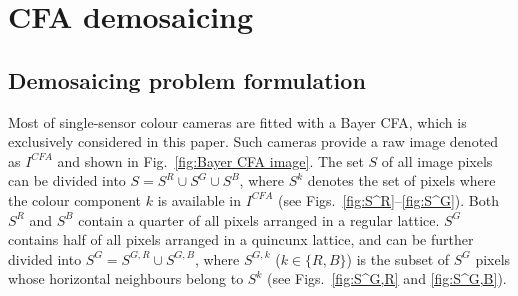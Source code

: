 \documentclass[twoside]{article}
\begin{document}


\section{CFA demosaicing}
\label{sec:CFA_demosaicing}

\subsection{Demosaicing problem formulation}
\label{subsec:problem_formulation}

Most of single-sensor colour cameras are fitted with a Bayer CFA, which is exclusively considered in this paper. Such cameras provide a raw image denoted as $I^{CFA}$ and shown in Fig.~\ref{fig:Bayer CFA image}. The set $S$ of all image pixels can be divided into $S = S^R \cup S^G \cup S^B$, where $S^k$ denotes the set of pixels where the colour component $k$ is available in $I^{CFA}$ (see Figs.~\ref{fig:S^R}--\ref{fig:S^G}). Both $S^R$ and $S^B$ contain a quarter of all pixels arranged in a regular lattice. $S^G$ contains half of all pixels arranged in a quincunx lattice, and can be further divided into $S^G = S^{G,R} \cup S^{G,B}$, where $S^{G,k}$ ($k \in \{R,B\}$) is the subset of $S^G$ pixels whose horizontal neighbours belong to $S^k$ (see Figs.~\ref{fig:S^G,R} and \ref{fig:S^G,B}).
\end{document}
